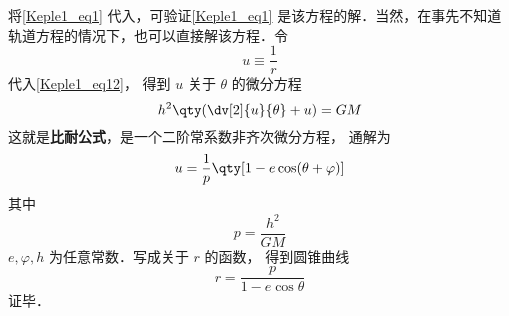 将\autoref{Keple1_eq1} 代入，可验证\autoref{Keple1_eq1} 是该方程的解．当然，在事先不知道轨道方程的情况下，也可以直接解该方程．令
\begin{equation}\label{Keple1_eq13}
u \equiv \frac{1}{r}
\end{equation}
代入\autoref{Keple1_eq12}，  得到 $u$ 关于 $\theta $ 的微分方程
\begin{equation}\label{Keple1_eq15}
h^2 \qty( \dv[2]{u}{\theta} + u ) =  GM
\end{equation}
这就是\textbf{比耐公式}，是一个二阶常系数非齐次微分方程，
通解为
\begin{equation}
u = \frac{1}{p} \qty[1 - e\cos(\theta  + \varphi)]
\end{equation}
其中
\begin{equation}
p = \frac{h^2}{GM}
\end{equation}
$e, \varphi, h$ 为任意常数．写成关于 $r$ 的函数， 得到圆锥曲线
\begin{equation}\label{Keple1_eq16}
r = \frac{p}{1 - e \cos \theta }
\end{equation}
证毕．
